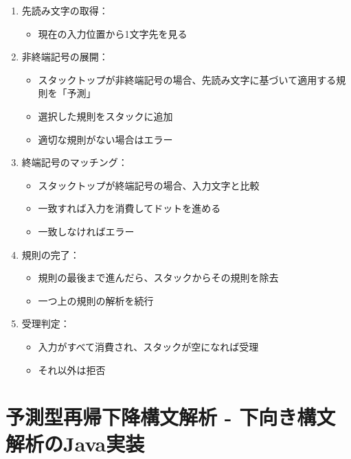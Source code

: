 \begin{enumerate}
\def\labelenumi{\arabic{enumi}.}
\tightlist
\item
  先読み文字の取得：

  \begin{itemize}
  \tightlist
  \item
    現在の入力位置から1文字先を見る
  \end{itemize}
\item
  非終端記号の展開：

  \begin{itemize}
  \tightlist
  \item
    スタックトップが非終端記号の場合、先読み文字に基づいて適用する規則を「予測」
  \item
    選択した規則をスタックに追加
  \item
    適切な規則がない場合はエラー
  \end{itemize}
\item
  終端記号のマッチング：

  \begin{itemize}
  \tightlist
  \item
    スタックトップが終端記号の場合、入力文字と比較
  \item
    一致すれば入力を消費してドットを進める
  \item
    一致しなければエラー
  \end{itemize}
\item
  規則の完了：

  \begin{itemize}
  \tightlist
  \item
    規則の最後まで進んだら、スタックからその規則を除去
  \item
    一つ上の規則の解析を続行
  \end{itemize}
\item
  受理判定：

  \begin{itemize}
  \tightlist
  \item
    入力がすべて消費され、スタックが空になれば受理
  \item
    それ以外は拒否
  \end{itemize}
\end{enumerate}

\hypertarget{chapter5-ux4e88ux6e2cux578bux518dux5e30ux4e0bux964dux69cbux6587ux89e3ux6790---ux4e0bux5411ux304dux69cbux6587ux89e3ux6790ux306ejavaux5b9fux88c5}{%
\section{予測型再帰下降構文解析 -
下向き構文解析のJava実装}\label{chapter5-ux4e88ux6e2cux578bux518dux5e30ux4e0bux964dux69cbux6587ux89e3ux6790---ux4e0bux5411ux304dux69cbux6587ux89e3ux6790ux306ejavaux5b9fux88c5}}

